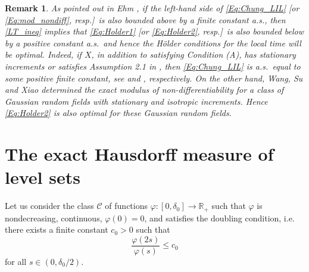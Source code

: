 \documentclass[11pt, reqno]{amsart}
\newtheorem{remark}[theorem]{Remark}
\def\R{{\mathbb R}}
\numberwithin{equation}{section}
\begin{document}
\begin{remark}\label{Re:optimal}
As pointed out in Ehm \cite{E81}, if the left-hand side of \eqref{Eq:Chung_LIL} [or \eqref{Eq:mod_nondiff}, resp.]~is 
also bounded above by a finite constant a.s., then \eqref{LT_ineq} implies that \eqref{Eq:Holder1} [or 
\eqref{Eq:Holder2}, resp.]~is also bounded below by a positive constant a.s.~and hence the H\"older conditions for 
the local time will be optimal. Indeed, if $X$, in addition to satisfying Condition (A), has stationary increments or satisfies 
Assumption 2.1 in \cite{DMX17}, then \eqref{Eq:Chung_LIL} is a.s.~equal to some positive finite constant, see 
 \cite{LX10} and \cite{LeeX21}, respectively. On the other hand, Wang, Su and Xiao \cite{WangSX20} determined 
the exact modulus of non-differentiability for a class of Gaussian random fields with stationary and isotropic increments.
Hence \eqref{Eq:Holder2} is also optimal for these Gaussian random fields.
\end{remark}


\section{The exact Hausdorff measure of level sets}
\label{sect:level_set}

Let us consider the class $\mathscr{C}$ of functions $\varphi: [0, \delta_0] \to \R_+$ such that $\varphi$ is 
nondecreasing, continuous, $\varphi(0) = 0$, and satisfies the doubling condition, i.e. there exists a finite constant 
$c_0 > 0$ such that
\begin{equation}\label{Eq:gauge_function_doubling_cond}
\frac{\varphi(2s)}{\varphi(s)} \le c_0
\end{equation}
for all $s \in (0, \delta_0/2)$.
\end{document}
